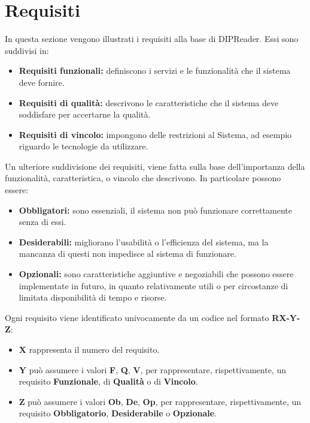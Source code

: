 \documentclass[a4paper,12pt]{article}
\begin{document}
    \section{Requisiti} {
        In questa sezione vengono illustrati i requisiti alla base di DIPReader. Essi sono suddivisi in:
        \begin{itemize}
            \item \textbf{Requisiti funzionali:} definiscono i servizi e le funzionalità che il sistema deve fornire.
            \item \textbf{Requisiti di qualità:} descrivono le caratteristiche che il sistema deve soddisfare per accertarne la qualità.
            \item \textbf{Requisiti di vincolo:} impongono delle restrizioni al Sistema, ad esempio riguardo le tecnologie da utilizzare.
        \end{itemize}
        Un ulteriore suddivisione dei requisiti, viene fatta sulla base dell'importanza della funzionalità, caratteristica, o vincolo che descrivono. In particolare possono essere:
        \begin{itemize}
            \item \textbf{Obbligatori:} sono essenziali, il sistema non può funzionare correttamente senza di essi.
            \item \textbf{Desiderabili:} migliorano l’usabilità o l’efficienza del sistema, ma la mancanza di questi non impedisce al sistema di funzionare.
            \item \textbf{Opzionali:} sono caratteristiche aggiuntive e negoziabili che possono essere implementate in futuro, in quanto relativamente utili o per circostanze di limitata disponibilità di tempo e risorse.
        \end{itemize}
        Ogni requisito viene identificato univocamente da un codice nel formato \textbf{RX-Y-Z}:
        \begin{itemize}
            \item \textbf{X} rappresenta il numero del requisito.
            \item \textbf{Y} può assumere i valori \textbf{F}, \textbf{Q}, \textbf{V}, per rappresentare, rispettivamente, un requisito \textbf{Funzionale}, di \textbf{Qualità} o di \textbf{Vincolo}.
            \item \textbf{Z} può assumere i valori \textbf{Ob}, \textbf{De}, \textbf{Op}, per rappresentare, rispettivamente, un requisito \textbf{Obbligatorio}, \textbf{Desiderabile} o \textbf{Opzionale}.
        \end{itemize}
}
\end{document}
